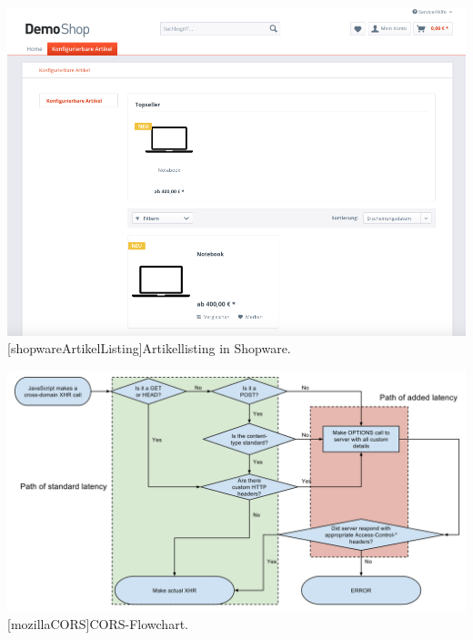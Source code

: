 \begin{appendix}
\vspace{1em}
\begin{minipage}{\linewidth}
	\centering
	\includegraphics[width=1\linewidth]{Abbildungen/shopwareArtikelListing.png}
	[shopwareArtikelListing]{Artikellisting in Shopware.}
	\label{app:shopwareArtikelListing}
\end{minipage}
\vspace{1em}

\vspace{1em}
\begin{minipage}{\linewidth}
	\centering
	\includegraphics[width=1\linewidth]{Abbildungen/mozillaCORS.png}
	[mozillaCORS]{CORS-Flowchart.}
	\label{app:mozillaCORS}
\end{minipage}
\vspace{1em}

\end{appendix}